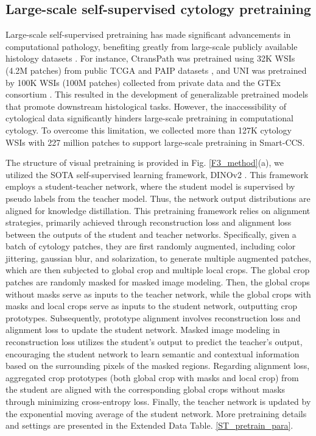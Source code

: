 \subsection*{Large-scale self-supervised cytology pretraining}\label{subsec4-3}
Large-scale self-supervised pretraining has made significant advancements in computational pathology, benefiting greatly from large-scale publicly available histology datasets \cite{huang2023visual,lu2024visual}. For instance, CtransPath was pretrained using 32K WSIs (4.2M patches) from public TCGA and PAIP datasets \cite{wang2022transformer}, and UNI was pretrained by 100K WSIs (100M patches) collected from private data and the GTEx consortium \cite{chen2024towards}.
This resulted in the development of generalizable pretrained models that promote downstream histological tasks. However, the inaccessibility of cytological data significantly hinders large-scale pretraining in computational cytology. To overcome this limitation, we collected more than 127K cytology WSIs with 227 million patches to support large-scale pretraining in Smart-CCS.

 The structure of visual pretraining is provided in Fig. \ref{F3_method}(a), we utilized the SOTA self-supervised learning framework, DINOv2 \cite{oquabdinov2}. This framework employs a student-teacher network, where the student model is supervised by pseudo labels from the teacher model. Thus, the network output distributions are aligned for knowledge distillation. This pretraining framework relies on alignment strategies, primarily achieved through reconstruction loss and alignment loss between the outputs of the student and teacher networks. Specifically, given a batch of cytology patches, they are first randomly augmented, including color jittering, gaussian blur, and solarization, to generate multiple augmented patches, which are then subjected to global crop and multiple local crops. The global crop patches are randomly masked for masked image modeling.
Then, the global crops without masks serve as inputs to the teacher network, while the global crops with masks and local crops serve as inputs to the student network, outputting crop prototypes. Subsequently, prototype alignment involves reconstruction loss and alignment loss to update the student network. Masked image modeling in reconstruction loss utilizes the student's output to predict the teacher's output, encouraging the student network to learn semantic and contextual information based on the surrounding pixels of the masked regions. Regarding alignment loss, aggregated crop prototypes (both global crop with masks and local crop) from the student are aligned with the corresponding global crops without masks through minimizing cross-entropy loss. Finally, the teacher network is updated by the exponential moving average of the student network. More pretraining details and settings are presented in the Extended Data Table. \ref{ST_pretrain_para}.

